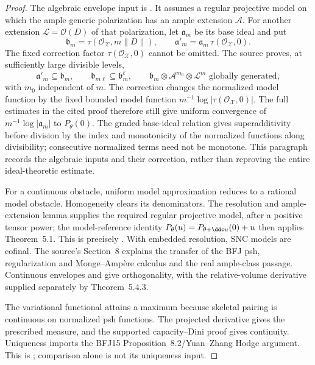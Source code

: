 \begin{proof}
The algebraic envelope input is
\cite[Theorem~5.1]{FGK25}.  It assumes a regular projective model on
which the ample generic polarization has an ample extension
$\mathcal A$.  For another extension $\mathcal L=\mathcal O(D)$
of that polarization, let $\mathfrak a_m$ be its base ideal and put
\[
 \mathfrak b_m=\tau(\mathcal O_{\mathcal X},m\|D\|),\qquad
 \mathfrak a'_m=\mathfrak a_m\,\tau(\mathcal O_{\mathcal X},0).
\]
The fixed correction factor $\tau(\mathcal O_{\mathcal X},0)$ cannot
be omitted.  The source proves, at sufficiently large divisible levels,
\[
 \mathfrak a'_m\subseteq\mathfrak b_m,\qquad
 \mathfrak b_{m\ell}\subseteq\mathfrak b_m^\ell,\qquad
 \mathfrak b_m\otimes\mathcal A^{m_0}\otimes\mathcal L^m
       \text{ globally generated},
\]
with $m_0$ independent of $m$.  The correction changes the normalized
model function by the fixed bounded model function
$m^{-1}\log|\tau(\mathcal O_{\mathcal X},0)|$.  The full estimates in
the cited proof therefore still give uniform convergence of
$m^{-1}\log|\mathfrak a_m|$ to $P_\theta(0)$.
The graded base-ideal relation gives superadditivity before division
by the index and monotonicity of the normalized functions along
divisibility; consecutive normalized terms need not be monotone.
This paragraph records the algebraic inputs and their correction,
rather than reproving the entire ideal-theoretic estimate.

For a continuous obstacle, uniform model approximation reduces to a
rational model obstacle.  Homogeneity clears its denominators.
The resolution and ample-extension lemma
\cite[Lemma~6.4]{FGK25} supplies the required regular projective model,
after a positive tensor power; the model-reference identity
$P_\theta(u)=P_{\theta+\ddc u}(0)+u$ then applies Theorem~5.1.
This is precisely \cite[Theorem~7.1 and its proof]{FGK25}.
With embedded resolution, SNC models are cofinal.  The source's
Section~8 explains the transfer of the BFJ psh, regularization and
Monge--Amp\`ere calculus and the real ample-class passage.
Continuous envelopes and
\cite[Theorems~6.3.2--6.3.3]{BGGJKM20} give orthogonality, with the
relative-volume derivative supplied separately by Theorem~5.4.3.

The variational functional attains a maximum because skeletal pairing
is continuous on normalized psh functions.  The projected derivative
gives the prescribed measure, and the supported capacity--Dini proof
gives continuity.  Uniqueness imports the BFJ15
Proposition~8.2/Yuan--Zhang Hodge argument.  This is
\cite[Theorem~8.1 and its full proof]{FGK25}; comparison alone is not
its uniqueness input.
\end{proof}

